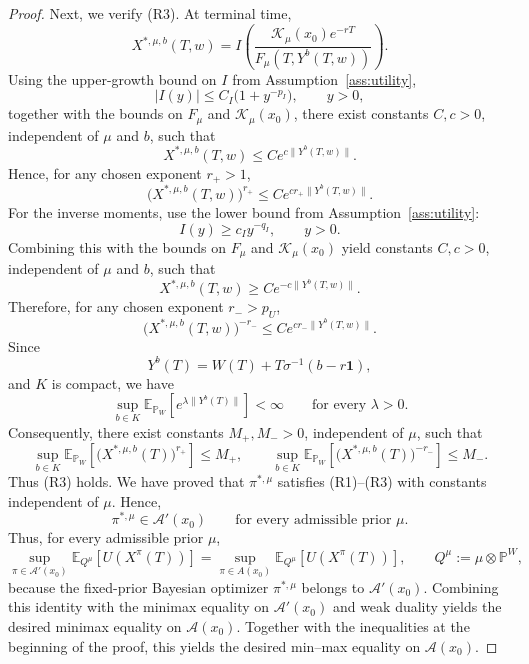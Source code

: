 \documentclass[11pt]{article}
\theoremstyle{definition}
\begin{document}
\begin{proof}
{Next, we verify (R3).
At terminal time,
\[
X^{*,\mu,b}(T,w)
=
I\!\left(
\frac{\mathcal{K}_\mu(x_0)e^{-rT}}{F_\mu(T,Y^b(T,w))}
\right).
\]
Using the upper-growth bound on $I$ from Assumption~\ref{ass:utility},
\[
|I(y)|\le C_I\bigl(1+y^{-p_I}\bigr),
\qquad y>0,
\]
together with the bounds on $F_\mu$ and $\mathcal{K}_\mu(x_0)$, there exist constants $C,c>0$,
independent of $\mu$ and $b$, such that
\[
X^{*,\mu,b}(T,w)\le C e^{c\|Y^b(T,w)\|}.
\]
Hence, for any chosen exponent $r_+>1$,
\[
\bigl(X^{*,\mu,b}(T,w)\bigr)^{r_+}
\le
C e^{c r_+\|Y^b(T,w)\|}.
\]
For the inverse moments, use the lower bound from Assumption~\ref{ass:utility}: 
\[
I(y)\ge c_I y^{-q_I},
\qquad y>0.
\]
Combining this with the bounds on $F_\mu$ and $\mathcal{K}_\mu(x_0)$ yield constants $C,c>0$,
independent of $\mu$ and $b$, such that
\[
X^{*,\mu,b}(T,w)\ge C e^{-c\|Y^b(T,w)\|}.
\]
Therefore, for any chosen exponent $r_->p_U$,
\[
\bigl(X^{*,\mu,b}(T,w)\bigr)^{-r_-}
\le
C e^{c r_-\|Y^b(T,w)\|}.
\]
Since
\[
Y^b(T) = W(T) + T\sigma^{-1}(b-r\mathbf{1}),
\]
and $K$ is compact, we have
\[
\sup_{b\in K}
\mathbb{E}_{\mathbb{P}_W}\!\left[e^{\lambda \|Y^b(T)\|}\right]
<\infty
\qquad\text{for every }\lambda>0.
\]
Consequently, there exist constants $M_+,M_->0$, independent of $\mu$, such that
\[
\sup_{b\in K}
\mathbb{E}_{\mathbb{P}_W}\!\left[
\bigl(X^{*,\mu,b}(T)\bigr)^{r_+}
\right]
\le M_+,
\qquad
\sup_{b\in K}
\mathbb{E}_{\mathbb{P}_W}\!\left[
\bigl(X^{*,\mu,b}(T)\bigr)^{-r_-}
\right]
\le M_-.
\]
Thus (R3) holds.
We have proved that $\pi^{*,\mu}$ satisfies (R1)--(R3) with constants independent of $\mu$.
Hence, 
\[
\pi^{*,\mu}\in \mathcal{A}'(x_0)
\qquad\text{for every admissible prior }\mu.
\]
Thus, for every admissible prior \(\mu\),
\[
\sup_{\pi\in \mathcal A'(x_0)} \mathbb{E}_{{Q}^\mu}[U(X^\pi(T))]
=
\sup_{\pi\in A(x_0)} \mathbb{E}_{{Q}^\mu}[U(X^\pi(T))],
\qquad {Q}^\mu:=\mu\otimes \mathbb P^W,
\]
because the fixed-prior Bayesian optimizer \(\pi^{*,\mu}\) belongs to \(\mathcal A'(x_0)\).
Combining this identity with the minimax equality on \(\mathcal A'(x_0)\) and weak duality yields the
desired minimax equality on \(\mathcal A(x_0)\).
}
Together with the inequalities at the beginning of the proof, this yields the
desired min–max equality on $\mathcal{A}(x_0)$.


\end{proof}
\end{document}
